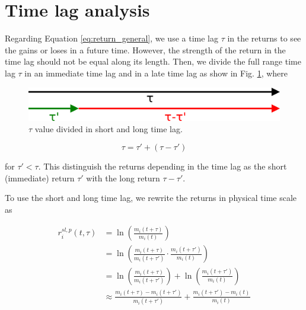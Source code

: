 \section{Time lag analysis}\label{sec:short_long}

Regarding Equation \ref{eq:return_general}, we use a time lag $\tau$ in the
returns to see the gains or loses in a future time. However, the strength of
the return in the time lag should not be equal along its length. Then, we
divide the full range time lag $\tau$ in an immediate time lag and in a late
time lag as show in Fig. \ref{fig:tau_short_long}, where

\begin{figure}[htbp]
    \centering
    \includegraphics[width=\columnwidth]{figures/05_tau_short_long.png}
    \caption{$\tau$ value divided in short and long time lag.}
    \label{fig:tau_short_long}
\end{figure}

\begin{equation}\label{eq:tau_short_long}
    \tau = \tau' + \left( \tau - \tau' \right)
\end{equation}

for $\tau' < \tau$. This distinguish the returns depending in the time lag as
the short (immediate) return $\tau'$ with the long return $\tau - \tau'$.

To use the short and long time lag, we rewrite the returns in physical time
scale as

\begin{align}\label{eq:short_long_return}
    r^{sl,p}_{i}\left(t,\tau\right)&=\ln\left(\frac{m_{i}\left(t+\tau\right)}
    {m_{i} \left(t\right)}\right) \nonumber \\
    &=\ln\left(\frac{m_{i}\left(t+\tau\right)}{m_{i}\left(t+\tau'\right)}
    \cdot\frac{m_{i} \left(t+\tau'\right)}{m_{i}\left(t\right)}\right)
    \nonumber \\
    &=\ln\left(\frac{m_{i}\left(t+\tau\right)}{m_{i}\left(t+\tau'\right)}
    \right)+ \ln\left(\frac{m_{i}\left(t+\tau'\right)}{m_{i}\left(t\right)}
    \right)\nonumber \\
    &\approx\frac{m_{i}\left(t+\tau\right)-m_{i}\left(t+\tau'\right)}
    {m_{i}\left(t+\tau'\right)} +\frac{m_{i}\left(t+\tau'\right)-m_{i}
    \left(t\right)}{m_{i}\left(t\right)}
\end{align}

